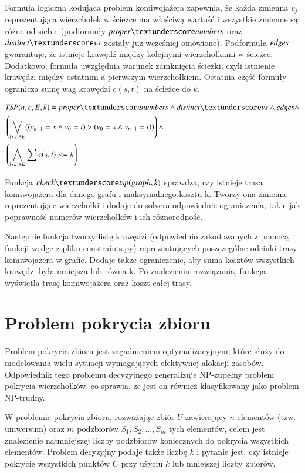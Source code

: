 Formuła logiczna kodująca problem komiwojażera zapewnia, że każda zmienna \(v_j\) reprezentująca wierzchołek w ścieżce ma właściwą wartość i wszystkie zmienne są różne od siebie (podformuły $\propernumbers$ oraz $\distinctvs$ zostały już wcześniej omówione). Podformuła ${\mathit{edges}}$ gwarantuje, że istnieje krawędź między kolejnymi wierzchołkami w ścieżce. Dodatkowo, formuła uwzględnia warunek zamknięcia ścieżki, czyli istnienie krawędzi między ostatnim a pierwszym wierzchołkiem. Ostatnia część formuły ogranicza sumę wag krawędzi $c(s, t)$ na ścieżce do \(k\).

\begin{align*}
	&\TSP(n, c, E, k) = \propernumbers \land \distinctvs \land \edges \land \\
	&\left( \bigvee_{\{s,t\} \in E} ((v_{n-1} = s \land v_0 = t) \lor (v_0 = s \land v_{n-1} = t)) \right) \land \\
	&\left( \bigwedge_{\{s,t\} \in E} \sum c(s,t) <= k \right)
\end{align*}

Funkcja $\checktsp$ sprawdza, czy istnieje trasa komiwojażera dla danego grafu i maksymalnego kosztu k. Tworzy ona zmienne reprezentujące wierzchołki i dodaje do solvera odpowiednie ograniczenia, takie jak poprawność numerów wierzchołków i ich różnorodność.

Następnie funkcja tworzy listę krawędzi (odpowiednio zakodowanych z pomocą funkcji wedge z pliku constraints.py) reprezentujących poszczególne odcinki trasy komiwojażera w grafie. Dodaje także ograniczenie, aby suma kosztów wszystkich krawędzi była mniejsza lub równa k. Po znalezieniu rozwiązania, funkcja wyświetla trasę komiwojażera oraz koszt całej trasy.



\section{Problem pokrycia zbioru}
Problem pokrycia zbioru jest zagadnieniem optymalizacyjnym, które służy do modelowania wielu sytuacji wymagających efektywnej alokacji zasobów. Odpowiednik tego problemu decyzyjnego generalizuje NP-zupełny problem pokrycia wierzchołków, co sprawia, że jest on również klasyfikowany jako problem NP-trudny.

W problemie pokrycia zbioru, rozważając zbiór \(U\) zawierający \(n\) elementów (tzw. uniwersum) oraz \(m\) podzbiorów $S_1, S_2, …, S_m$ tych elementów, celem jest znalezienie najmniejszej liczby podzbiorów koniecznych do pokrycia wszystkich elementów. Problem decyzyjny podaje także liczbę \(k\) i pytanie jest, czy istnieje pokrycie wszystkich punktów \(C\) przy użyciu \(k\) lub mniejszej liczby zbiorów.

